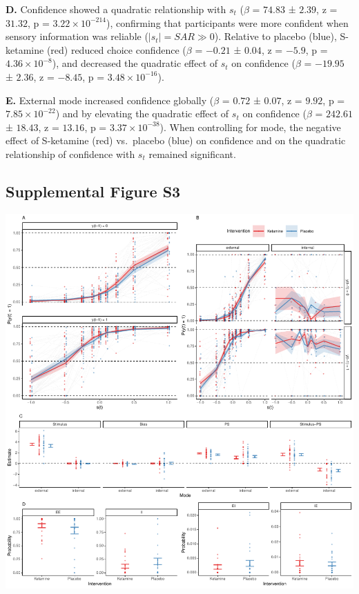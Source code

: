 \documentclass[
]{article}
\begin{document}
\textbf{D.} Confidence showed a quadratic relationship with \(s_t\)
(\(\beta\) = \(74.83\) ± \(2.39\), z = \(31.32\), p =
\(\ensuremath{3.22\times 10^{-214}}\)), confirming that participants
were more confident when sensory information was reliable
(\(|s_t| = SAR \gg  0\)). Relative to placebo (blue), S-ketamine (red)
reduced choice confidence (\(\beta\) = \(-0.21\) ± \(0.04\), z =
\(-5.9\), p = \(\ensuremath{4.36\times 10^{-8}}\)), and decreased the
quadratic effect of \(s_t\) on confidence (\(\beta\) = \(-19.95\) ±
\(2.36\), z = \(-8.45\), p = \(\ensuremath{3.48\times 10^{-16}}\)).

\textbf{E.} External mode increased confidence globally (\(\beta\) =
\(0.72\) ± \(0.07\), z = \(9.92\), p =
\(\ensuremath{7.85\times 10^{-22}}\)) and by elevating the quadratic
effect of \(s_t\) on confidence (\(\beta\) = \(242.61\) ± \(18.43\), z =
\(13.16\), p = \(\ensuremath{3.37\times 10^{-38}}\)). When controlling
for mode, the negative effect of S-ketamine (red) vs.~placebo (blue) on
confidence and on the quadratic relationship of confidence with \(s_t\)
remained significant.

\newpage

\subsection{Supplemental Figure S3}\label{supplemental-figure-s3}

\includegraphics{modes_ketamine_scz_files/figure-latex/Supplemental_Figure_S3-1.pdf}
\end{document}
